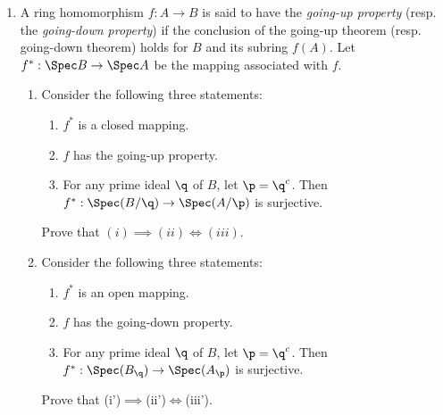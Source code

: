 \documentclass[12pt]{amsart}
\begin{document}
\begin{enumerate}
	\item[5.10.] {
      A ring homomorphism $f:A\to B$ is said to have the \emph{going-up property} (resp. the \emph{going-down property}) if the conclusion of the going-up theorem (resp. going-down theorem) holds for $B$ and its subring $f(A)$.
      Let $f^*:\Spec B\to \Spec A$ be the mapping associated with $f$.
      \begin{enumerate}
        \item Consider the following three statements:
          \begin{enumerate}
            \item $f^*$ is a closed mapping.
            \item $f$ has the going-up property.
            \item For any prime ideal $\q$ of $B$, let $\p=\q^c$.
              Then $f^*:\Spec(B/\q)\to \Spec (A/\p)$ is surjective.
          \end{enumerate}
          Prove that $(i)\implies (ii)\iff (iii)$.
        \item Consider the following three statements:
          \begin{enumerate}[label=(\roman*')]
            \item $f^*$ is an open mapping.
            \item $f$ has the going-down property.
            \item For any prime ideal $\q$ of $B$, let $\p=\q^c$.
              Then $f^*:\Spec(B_\q)\to \Spec (A_\p)$ is surjective.
          \end{enumerate}
          Prove that (i')$\implies$(ii')$\iff $(iii').
      \end{enumerate}
    }
\end{enumerate}
\end{document}
